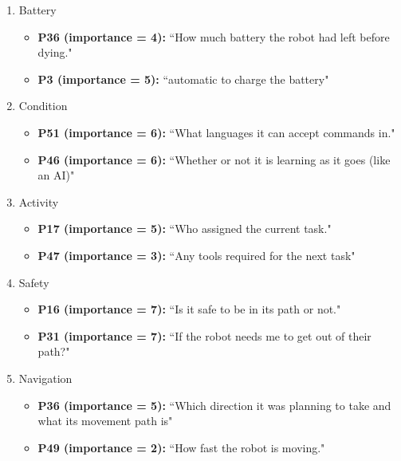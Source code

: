 \documentclass[letterpaper, 10 pt, conference]{ieeeconf}  %
\begin{document}
\begin{enumerate}
\item Battery
    \begin{itemize}
        \item  \textbf{P36 (importance = 4):} ``How much battery the robot had left before dying."
        \item  \textbf{P3 (importance = 5):} ``automatic to charge the battery"
    \end{itemize}
    
\item Condition
    \begin{itemize}
        \item  \textbf{P51 (importance = 6):} ``What languages it can accept commands in."
        \item  \textbf{P46 (importance = 6):} ``Whether or not it is learning as it goes (like an AI)"
    \end{itemize}

\item Activity
    \begin{itemize}
        \item  \textbf{P17 (importance = 5):} ``Who assigned the current task."
        \item  \textbf{P47 (importance = 3):} ``Any tools required for the next task"
    \end{itemize}
    
\item Safety
    \begin{itemize}
    \item  \textbf{P16 (importance = 7):} ``Is it safe to be in its path or not."
    \item  \textbf{P31 (importance = 7):} ``If the robot needs me to get out of their path?"
    \end{itemize}
    
\item Navigation
    \begin{itemize}
    
        \item  \textbf{P36 (importance = 5):} ``Which direction it was planning to take and what its movement path is"
        \item  \textbf{P49 (importance = 2):} ``How fast the robot is moving."
    \end{itemize}


\end{enumerate}
\end{document}
